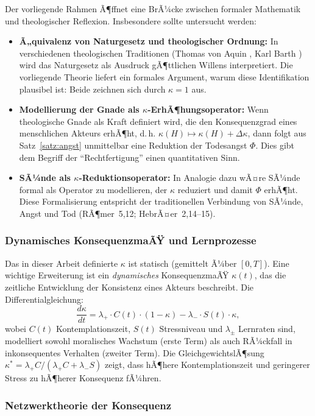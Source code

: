 ﻿\documentclass[a4paper,12pt]{article}
\theoremstyle{definition}
\begin{document}
Der vorliegende Rahmen Ã¶ffnet eine BrÃ¼cke zwischen formaler Mathematik und theologischer Reflexion. Insbesondere sollte untersucht werden:
\begin{itemize}
\item \textbf{Ã„quivalenz von Naturgesetz und theologischer Ordnung:} In verschiedenen theologischen Traditionen (Thomas von Aquin \cite{aquin1266}, Karl Barth \cite{barth1932}) wird das Naturgesetz als Ausdruck gÃ¶ttlichen Willens interpretiert. Die vorliegende Theorie liefert ein formales Argument, warum diese Identifikation plausibel ist: Beide zeichnen sich durch $\kappa = 1$ aus.
\item \textbf{Modellierung der Gnade als $\kappa$-ErhÃ¶hungsoperator:} Wenn theologische Gnade als Kraft definiert wird, die den Konsequenzgrad eines menschlichen Akteurs erhÃ¶ht, d.\,h. $\kappa(H) \mapsto \kappa(H) + \Delta\kappa$, dann folgt aus Satz~\ref{satz:angst} unmittelbar eine Reduktion der Todesangst $\Phi$. Dies gibt dem Begriff der ``Rechtfertigung'' einen quantitativen Sinn.
\item \textbf{SÃ¼nde als $\kappa$-Reduktionsoperator:} In Analogie dazu wÃ¤re SÃ¼nde formal als Operator zu modellieren, der $\kappa$ reduziert und damit $\Phi$ erhÃ¶ht. Diese Formalisierung entspricht der traditionellen Verbindung von SÃ¼nde, Angst und Tod (RÃ¶mer~5,12; HebrÃ¤er~2,14--15).
\end{itemize}

\subsubsection{Dynamisches KonsequenzmaÃŸ und Lernprozesse}

Das in dieser Arbeit definierte $\kappa$ ist statisch (gemittelt Ã¼ber $[0,T]$). Eine wichtige Erweiterung ist ein \emph{dynamisches} KonsequenzmaÃŸ $\kappa(t)$, das die zeitliche Entwicklung der Konsistenz eines Akteurs beschreibt. Die Differentialgleichung:
\[
\frac{d\kappa}{dt} = \lambda_+ \cdot C(t) \cdot (1 - \kappa) - \lambda_- \cdot S(t) \cdot \kappa,
\]
wobei $C(t)$ Kontemplationszeit, $S(t)$ Stressniveau und $\lambda_\pm$ Lernraten sind, modelliert sowohl moralisches Wachstum (erste Term) als auch RÃ¼ckfall in inkonsequentes Verhalten (zweiter Term). Die GleichgewichtslÃ¶sung $\kappa^* = \lambda_+ C / (\lambda_+ C + \lambda_- S)$ zeigt, dass hÃ¶here Kontemplationszeit und geringerer Stress zu hÃ¶herer Konsequenz fÃ¼hren.

\subsubsection{Netzwerktheorie der Konsequenz}
\end{document}
